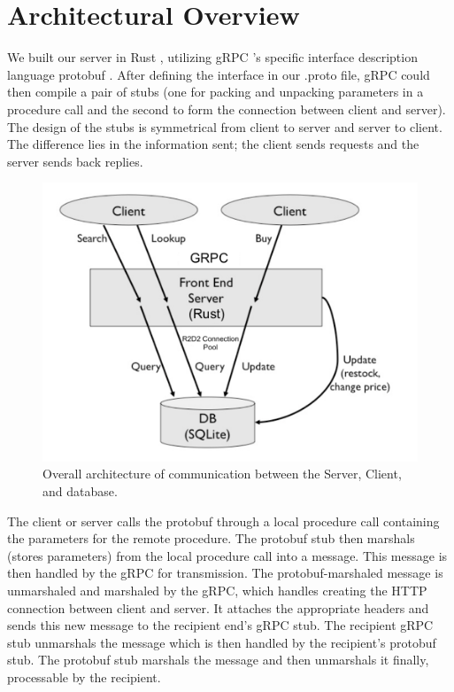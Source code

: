 \documentclass[letterpaper,11pt,twocolumn]{article}
\begin{document}
\section{Architectural Overview}

We built our server in Rust \cite{rust}, utilizing gRPC \cite{grpc}'s specific interface description language protobuf \cite{protobuf}. After defining the interface in our .proto file, gRPC could then compile a pair of stubs (one for packing and unpacking parameters in a procedure call and the second to form the connection between client and server). The design of the stubs is symmetrical from client to server and server to client. The difference lies in the information sent; the client sends requests and the server sends back replies. 

\begin{figure}[htb]
    \centering
    \includegraphics[width=\linewidth]{diagram.png}
    \caption{Overall architecture of communication between the Server, Client, and database.}
    \label{fig:architecture}
\end{figure}

The client or server calls the protobuf through a local procedure call containing the parameters for the remote procedure. The protobuf stub then marshals (stores parameters) from the local procedure call into a message. This message is then handled by the gRPC for transmission. The protobuf-marshaled message is unmarshaled and marshaled by the gRPC, which handles creating the HTTP connection between client and server. It attaches the appropriate headers and sends this new message to the recipient end's gRPC stub. The recipient gRPC stub unmarshals the message which is then handled by the recipient's protobuf stub. The protobuf stub marshals the message and then unmarshals it finally, processable by the recipient. 
\end{document}
